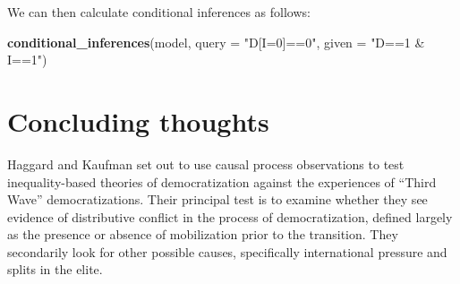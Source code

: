 \documentclass[
  12pt,
]{book}
\newenvironment{Shaded}{\begin{snugshade}}{\end{snugshade}}
\newcommand{\DataTypeTok}[1]{\textcolor[rgb]{0.13,0.29,0.53}{#1}}
\newcommand{\KeywordTok}[1]{\textcolor[rgb]{0.13,0.29,0.53}{\textbf{#1}}}
\newcommand{\NormalTok}[1]{#1}
\newcommand{\OperatorTok}[1]{\textcolor[rgb]{0.81,0.36,0.00}{\textbf{#1}}}
\newcommand{\StringTok}[1]{\textcolor[rgb]{0.31,0.60,0.02}{#1}}
\begin{document}
\begin{Shaded}
\end{Shaded}

We can then calculate conditional inferences as follows:

\begin{Shaded}
\begin{Highlighting}[]
\KeywordTok{conditional_inferences}\NormalTok{(model, }
                       \DataTypeTok{query =} \StringTok{"D[I=0]==0"}\NormalTok{,}
                       \DataTypeTok{given =} \StringTok{"D==1 & I==1"}\NormalTok{)}
\end{Highlighting}
\end{Shaded}

\hypertarget{concluding-thoughts}{%
\section{Concluding thoughts}\label{concluding-thoughts}}

Haggard and Kaufman set out to use causal process observations to test inequality-based theories of democratization against the experiences of ``Third Wave'' democratizations. Their principal test is to examine whether they see evidence of distributive conflict in the process of democratization, defined largely as the presence or absence of mobilization prior to the transition. They secondarily look for other possible causes, specifically international pressure and splits in the elite.
\end{document}

